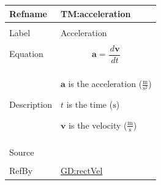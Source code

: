 \documentclass[12pt]{article}
\begin{document}
\vspace{\baselineskip}
\noindent
\begin{minipage}{\textwidth}
\begin{tabular}{>{\raggedright}p{}>{\raggedright\arraybackslash}p{}}
\toprule \textbf{Refname} & \textbf{TM:acceleration}
\label{TM:acceleration}
\\ \midrule \\
Label & Acceleration
        
\\ \midrule \\
Equation & \begin{displaymath}
           \symbf{a}=\frac{\,d\symbf{v}}{\,dt}
           \end{displaymath}
\\ \midrule \\
Description & \begin{symbDescription}
              \item{$\symbf{a}$ is the acceleration ($\frac{\text{m}}{\text{s}^{2}}$)}
              \item{$t$ is the time (${\text{s}}$)}
              \item{$\symbf{v}$ is the velocity ($\frac{\text{m}}{\text{s}}$)}
              \end{symbDescription}
\\ \midrule \\
Source & \cite{accelerationWiki}
         
\\ \midrule \\
RefBy & \hyperref[GD:rectVel]{GD:rectVel}
        
\\ \bottomrule
\end{tabular}
\end{minipage}
\vspace{\baselineskip}
\noindent
\end{document}
